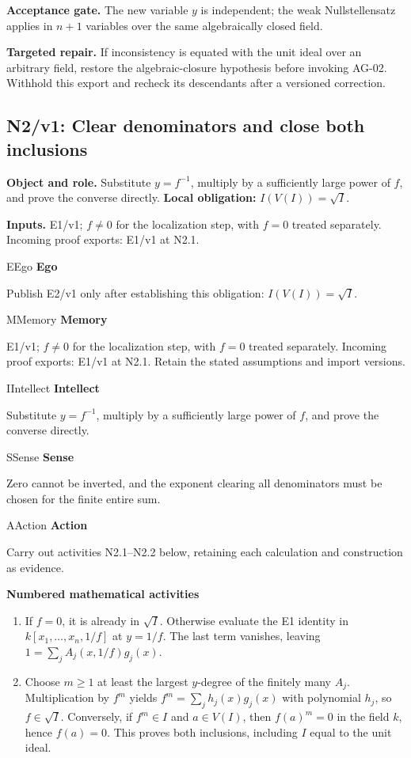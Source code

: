 \documentclass[preprint,12pt,aps,pra,showkeys,amsmath,amssymb,superscriptaddress,floatfix]{revtex4-2}
\theoremstyle{definition}
\theoremstyle{remark}
\newcommand{\mmfaculty}[3]{%
 \begin{mmfacultybox}{#1}{#2}
 {\sffamily\bfseries\color{MMBlue}#2}\par\smallskip #3
 \end{mmfacultybox}}
\newcommand{\field}[2]{\par\smallskip\noindent\textbf{#1.} #2\par}
\begin{document}
\field{Acceptance gate}{The new variable \(y\) is independent; the weak Nullstellensatz applies
in \(n+1\) variables over the same algebraically closed field.}

\field{Targeted repair}{If inconsistency is equated with the unit ideal over an arbitrary field,
restore the algebraic-closure hypothesis before invoking AG-02. Withhold
this export and recheck its descendants after a versioned correction.}

\clearpage

\subsection{N2/v1: Clear denominators and close both inclusions}

\field{Object and role}{Substitute \(y=f^{-1}\), multiply by a sufficiently large power of
\(f\), and prove the converse directly. \textbf{Local obligation:}
\(I(V(I))=\sqrt I\).}

\field{Inputs}{E1/v1; \(f\ne0\) for the localization step, with \(f=0\) treated
separately. Incoming proof exports: E1/v1 at N2.1.}

\mmfaculty{E}{Ego}{Publish E2/v1 only after establishing this obligation:
\(I(V(I))=\sqrt I\).}

\mmfaculty{M}{Memory}{E1/v1; \(f\ne0\) for the localization step, with \(f=0\) treated
separately. Incoming proof exports: E1/v1 at N2.1. Retain the stated
assumptions and import versions.}

\mmfaculty{I}{Intellect}{Substitute \(y=f^{-1}\), multiply by a sufficiently large power of
\(f\), and prove the converse directly.}

\mmfaculty{S}{Sense}{Zero cannot be inverted, and the exponent clearing all denominators must
be chosen for the finite entire sum.}

\mmfaculty{A}{Action}{Carry out activities N2.1--N2.2 below, retaining each calculation and
construction as evidence.}

\smallskip\noindent\textbf{Numbered mathematical activities}

\begin{enumerate}[label=N2.\arabic*,leftmargin=3.4em]

\item If \(f=0\), it is already in \(\sqrt I\). Otherwise evaluate the E1
identity in \(k[x_1,\ldots,x_n,1/f]\) at \(y=1/f\). The last term
vanishes, leaving \(1=\sum_j A_j(x,1/f)g_j(x)\).

\item Choose \(m\ge1\) at least the largest \(y\)-degree of the finitely many
\(A_j\). Multiplication by \(f^m\) yields \(f^m=\sum_j h_j(x)g_j(x)\)
with polynomial \(h_j\), so \(f\in\sqrt I\). Conversely, if \(f^m\in I\)
and \(a\in V(I)\), then \(f(a)^m=0\) in the field \(k\), hence
\(f(a)=0\). This proves both inclusions, including \(I\) equal to the
unit ideal.

\end{enumerate}
\end{document}
